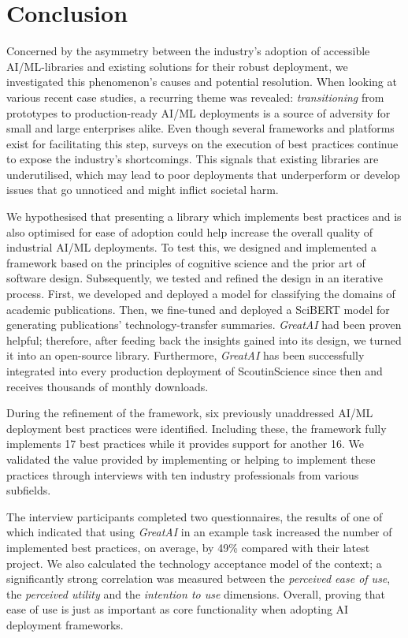 \chapter{Conclusion} \label{chapter:conclusion}

Concerned by the asymmetry between the industry's adoption of accessible AI/ML-libraries and existing solutions for their robust deployment, we investigated this phenomenon's causes and potential resolution. When looking at various recent case studies, a recurring theme was revealed: \textit{transitioning} from prototypes to production-ready AI/ML deployments is a source of adversity for small and large enterprises alike. Even though several frameworks and platforms exist for facilitating this step, surveys on the execution of best practices continue to expose the industry's shortcomings. This signals that existing libraries are underutilised, which may lead to poor deployments that underperform or develop issues that go unnoticed and might inflict societal harm.

We hypothesised that presenting a library which implements best practices and is also optimised for ease of adoption could help increase the overall quality of industrial AI/ML deployments. To test this, we designed and implemented a framework based on the principles of cognitive science and the prior art of software design. Subsequently, we tested and refined the design in an iterative process. First, we developed and deployed a model for classifying the domains of academic publications. Then, we fine-tuned and deployed a SciBERT model for generating publications' technology-transfer summaries. \textit{GreatAI} had been proven helpful; therefore, after feeding back the insights gained into its design, we turned it into an open-source library. Furthermore, \textit{GreatAI} has been successfully integrated into every production deployment of ScoutinScience since then and receives thousands of monthly downloads.

During the refinement of the framework, six previously unaddressed AI/ML deployment best practices were identified. Including these, the framework fully implements 17 best practices while it provides support for another 16. We validated the value provided by implementing or helping to implement these practices through interviews with ten industry professionals from various subfields.

The interview participants completed two questionnaires, the results of one of which indicated that using \textit{GreatAI} in an example task increased the number of implemented best practices, on average, by 49\% compared with their latest project. We also calculated the technology acceptance model of the context; a significantly strong correlation was measured between the \textit{perceived ease of use}, the \textit{perceived utility} and the \textit{intention to use} dimensions. Overall, proving that ease of use is just as important as core functionality when adopting AI deployment frameworks.

